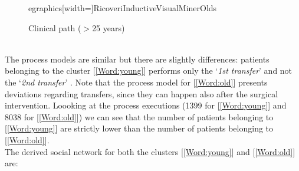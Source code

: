 \begin{figure} [htbp]
egraphics[width=\textwidth]{RicoveriInductiveVisualMinerOlds}
\caption{Clinical path ($>$25 years)}
\end{figure}\\
The process models are similar but there are slightly differences: patients belonging to the cluster [\ref{Word:young}] performs only the `\textit{1st transfer}' and not the `\textit{2nd transfer}'                                                                                                                                                                                                                                                                                                                                                                                                                                                                                                                                                                 . Note that the process model for [\ref{Word:old}] presents deviations regarding transfers, since they can happen also after the surgical intervention. Loooking at the process executions (1399 for [\ref{Word:young}] and 8038 for [\ref{Word:old}]) we can see that the number of patients belonging to [\ref{Word:young}] are strictly lower than the number of patients belonging to [\ref{Word:old}].\\
The derived social network for both the clusters [\ref{Word:young}] and [\ref{Word:old}] are:
